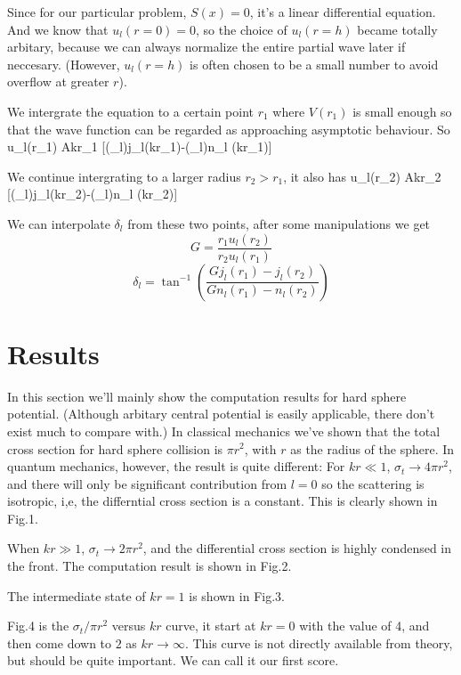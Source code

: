Since for our particular problem, $S(x)=0$, it's a linear differential
equation. And we know that $u_{l}(r=0) = 0$, so the choice of
$u_{l}(r=h)$ became totally arbitary, because we can always normalize
the entire partial wave later if neccesary. (However, $u_{l}(r=h)$ is
often chosen to be a small number to avoid overflow at greater $r$).

We intergrate the equation to a certain point $r_{1}$ where $V(r_{1})$
is small enough so that the wave function can be regarded as
approaching asymptotic behaviour. So
\ee u_{l}(r_{1}) \approx Akr_{1}
[\cos(\delta_{l})j_{l}(kr_{1})-\sin(\delta_{l})n_{l}
(kr_{1})] \ed

We continue intergrating to a larger radius $r_{2}>r_{1}$, it also has
\ee u_{l}(r_{2}) \approx Akr_{2}
[\cos(\delta_{l})j_{l}(kr_{2})-\sin(\delta_{l})n_{l} (kr_{2})] \ed

We can interpolate $\delta_{l}$ from these two points, after some
manipulations we get
$$ G =
\frac{r_{1}u_{l}(r_{2})}{r_{2}u_{l}(r_{1})}$$
$$\delta_{l} =
\tan^{-1}(\frac{Gj_{l}(r_{1})-j_{l}(r_{2})}
{Gn_{l}(r_{1})-n_{l}(r_{2})})$$ 
\newpage

\section{Results}

  

 

In this section we'll mainly show the computation results for hard
sphere potential. (Although arbitary central potential is easily
applicable, there don't exist much to compare with.) In classical
mechanics we've shown that the total cross section for hard sphere
collision is $\pi r^{2}$, with $r$ as the radius of the sphere.  In
quantum mechanics, however, the result is quite different: For $kr\ll
1$, $\sigma_{t} \rightarrow 4\pi r^2$, and there will only be
significant contribution from $l=0$ so the scattering is isotropic,
i,e, the differntial cross section is a constant. This is clearly
shown in Fig.1.

When $kr\gg 1$, $\sigma_{t} \rightarrow 2\pi r^2$, and the
differential cross section is highly condensed in the front. The
computation result is shown in Fig.2.

The intermediate state of $kr = 1$ is shown in Fig.3.

Fig.4 is the $\sigma_{t}/\pi r^{2}$ versus $kr$ curve, it start at
$kr=0$ with the value of 4, and then come down to $2$ as $kr
\rightarrow \infty$.  This curve is not directly available from
theory, but should be quite important. We can call it our first
score.


